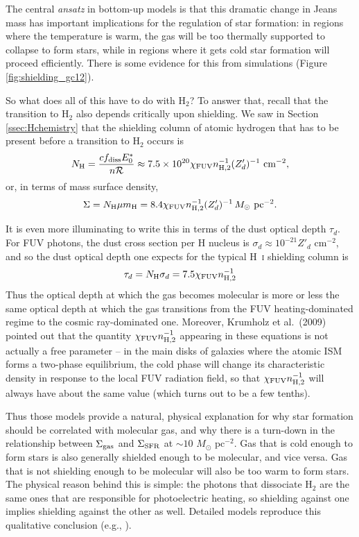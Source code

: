 The central \textit{ansatz} in bottom-up models is that this dramatic change in Jeans mass has important implications for the regulation of star formation: in regions where the temperature is warm, the gas will be too thermally supported to collapse to form stars, while in regions where it gets cold star formation will proceed efficiently. There is some evidence for this from simulations (Figure \ref{fig:shielding_gc12}).

So what does all of this have to do with H$_2$? To answer that, recall that the transition to H$_2$ also depends critically upon shielding. We saw in Section \ref{ssec:Hchemistry} that the shielding column of atomic hydrogen that has to be present before a transition to H$_2$ occurs is
\begin{equation}
N_{\rm H} = \frac{c f_{\rm diss} E_0^*}{n \mathcal{R}} \approx 7.5\times 10^{20} \chi_{\rm FUV} n_{\rm H,2}^{-1} (Z'_d)^{-1}\mbox{ cm}^{-2},
\end{equation}
or, in terms of mass surface density,
\begin{equation}
\Sigma = N_{\rm H} \mu m_{\rm H} = 8.4 \chi_{\rm FUV} n_{\rm H,2}^{-1} (Z'_d)^{-1}\,M_\odot\mbox{ pc}^{-2}.
\end{equation}

It is even more illuminating to write this in terms of the dust optical depth $\tau_d$. For FUV photons, the dust cross section per H nucleus is $\sigma_d \approx 10^{-21} Z'_d$ cm$^{-2}$, and so the dust optical depth one expects for the typical H~\textsc{i} shielding column is
\begin{equation}
\tau_d = N_{\rm H} \sigma_d = 7.5 \chi_{\rm FUV} n_{\rm H,2}^{-1}
\end{equation}
Thus the optical depth at which the gas becomes molecular is more or less the same optical depth at which the gas transitions from the FUV heating-dominated regime to the cosmic ray-dominated one. Moreover, Krumholz et al.~(2009) pointed out that the quantity $\chi_{\rm FUV} n_{\rm H,2}^{-1}$ appearing in these equations is not actually a free parameter -- in the main disks of galaxies where the atomic ISM forms a two-phase equilibrium, the cold phase will change its characteristic density in response to the local FUV radiation field, so that $\chi_{\rm FUV} n_{\rm H,2}^{-1}$ will always have about the same value (which turns out to be a few tenths).

Thus those models provide a natural, physical explanation for why star formation should be correlated with molecular gas, and why there is a turn-down in the relationship between $\Sigma_{\rm gas}$ and $\Sigma_{\rm SFR}$ at $\sim 10$ $M_\odot$ pc$^{-2}$. Gas that is cold enough to form stars is also generally shielded enough to be molecular, and vice versa. Gas that is not shielding enough to be molecular will also be too warm to form stars. The physical reason behind this is simple: the photons that dissociate H$_2$ are the same ones that are responsible for photoelectric heating, so shielding against one implies shielding against the other as well. Detailed models reproduce this qualitative conclusion (e.g., \citealt{krumholz11b}).

